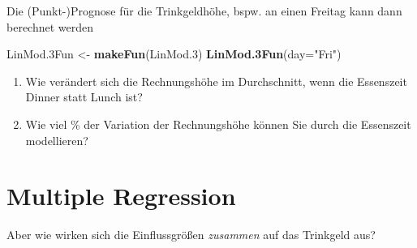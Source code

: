 \documentclass[12pt,ngerman,]{book}
\newenvironment{Shaded}{\begin{snugshade}}{\end{snugshade}}
\newcommand{\KeywordTok}[1]{\textcolor[rgb]{0.13,0.29,0.53}{\textbf{{#1}}}}
\newcommand{\DataTypeTok}[1]{\textcolor[rgb]{0.13,0.29,0.53}{{#1}}}
\newcommand{\FloatTok}[1]{\textcolor[rgb]{0.00,0.00,0.81}{{#1}}}
\newcommand{\StringTok}[1]{\textcolor[rgb]{0.31,0.60,0.02}{{#1}}}
\newcommand{\NormalTok}[1]{{#1}}
\providecommand{\tightlist}{%
  \setlength{\itemsep}{0pt}\setlength{\parskip}{0pt}}
\renewenvironment{Shaded}{\begin{kframe}}{\end{kframe}}
\let\BeginKnitrBlock\begin \let\EndKnitrBlock\end
\begin{document}
Die (Punkt-)Prognose für die Trinkgeldhöhe, bspw. an einen Freitag kann
dann berechnet werden

\begin{Shaded}
\begin{Highlighting}[]
\NormalTok{LinMod.3Fun <-}\StringTok{ }\KeywordTok{makeFun}\NormalTok{(LinMod}\FloatTok{.3}\NormalTok{)}
\KeywordTok{LinMod.3Fun}\NormalTok{(}\DataTypeTok{day=}\StringTok{"Fri"}\NormalTok{)}
\end{Highlighting}
\end{Shaded}

\BeginKnitrBlock{rmdexercises}
\begin{enumerate}
\def\labelenumi{\arabic{enumi}.}
\setcounter{enumi}{2}
\tightlist
\item
  Wie verändert sich die Rechnungshöhe im Durchschnitt, wenn die
  Essenszeit Dinner statt Lunch ist?
\item
  Wie viel \% der Variation der Rechnungshöhe können Sie durch die
  Essenszeit modellieren?
\end{enumerate}
\EndKnitrBlock{rmdexercises}

\section{Multiple Regression}\label{multiple-regression}

Aber wie wirken sich die Einflussgrößen \emph{zusammen} auf das
Trinkgeld aus?
\end{document}
